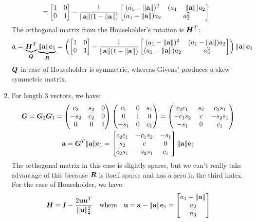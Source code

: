 \documentclass[]{exam}
\begin{document}
\begin{questions}
\begin{enumerate}[label=\arabic*.]
\begin{align*}
			&= \begin{bmatrix} 1 & 0 \\ 0 & 1 \end{bmatrix} - \frac{1}{\|\boldsymbol{\mathrm{a}}\|(1 - \|\boldsymbol{\mathrm{a}}\|)} \begin{bmatrix} (a_1 - \| \boldsymbol{\mathrm{a}} \|)^2 & (a_1 - \| \boldsymbol{\mathrm{a}} \|) a_2  \\ (a_1 - \| \boldsymbol{\mathrm{a}} \|) a_2 & a_2^2 \end{bmatrix}
		\end{align*}
		The orthogonal matrix from the Householder's rotation is $\boldsymbol{H}^T$:
		\begin{gather*}
			\boldsymbol{\mathrm{a}} = \underbrace{\boldsymbol{H}^T}_{\boldsymbol{Q}} \underbrace{\| \boldsymbol{\mathrm{a}} \| \boldsymbol{\mathrm{e}}_1}_{\boldsymbol{R}}
			= \left( \begin{bmatrix} 1 & 0 \\ 0 & 1 \end{bmatrix} - \frac{1}{\|\boldsymbol{\mathrm{a}}\|(1 - \|\boldsymbol{\mathrm{a}}\|)} \begin{bmatrix} (a_1 - \| \boldsymbol{\mathrm{a}} \|)^2 & (a_1 - \| \boldsymbol{\mathrm{a}} \|) a_2  \\ (a_1 - \| \boldsymbol{\mathrm{a}} \|) a_2 & a_2^2 \end{bmatrix} \right) \| \boldsymbol{\mathrm{a}} \| \boldsymbol{\mathrm{e}}_1
		\end{gather*}
		$\boldsymbol{Q}$ in case of Householder is symmetric, whereas Givens' produces a skew-symmetric matrix.
	\item For length 3 vectors, we have:
		\begin{gather*}
			\boldsymbol{G} = \boldsymbol{G}_2 \boldsymbol{G}_1 = 
			\begin{pmatrix}c_2&s_2&0\\ -s_2&c_2&0\\ 0&0&1\end{pmatrix}\begin{pmatrix}c_1&0&s_1\\ 0&1&0\\ -s_1&0&c_1\end{pmatrix} = 
			\begin{pmatrix}c_2c_1&s_2&c_2s_1\\ -c_1s_2&c&-s_2s_1\\ -s_1&0&c_1\end{pmatrix} \\
				\boldsymbol{\mathrm{a}} = \boldsymbol{G}^T \| \boldsymbol{\mathrm{a}} \| \boldsymbol{\mathrm{e}}_1 = \begin{bmatrix} c_2 c_1 & -c_1 s_2 & -s_1 \\ s_2 & c & 0 \\ c_2 s_1 & -s_2 s_1 & c_1 \end{bmatrix} \| \boldsymbol{\mathrm{a}} \| \boldsymbol{\mathrm{e}}_1 
		\end{gather*}
		The orthogonal matrix in  this case is slightly sparse, but we can't really take advantage of this because $\boldsymbol{R}$ is itself sparse and has a zero in the third index. For the case of Householder, we have:
		\begin{gather*}
			\mH = \mI - \frac{2 \vu \vu^T}{\|\vu\|^2_2} \quad \mathrm{where} \quad \vu = \va - \| \va \| \ve_1 = \bmat{a_1 - \|\va\| \\ a_2 \\ a_3} \\
			\begin{aligned}

\end{aligned}
\end{gather*}
\end{enumerate}
\end{questions}
\end{document}

